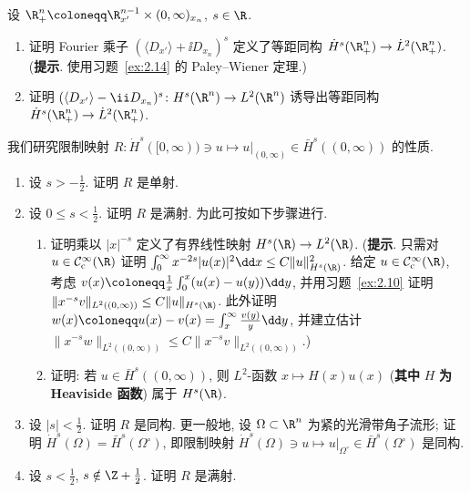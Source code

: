 \begin{exer}[移位算子]\label{ex:9.4}
设 $\R_+^n \defeq \R_{x'}^{n-1} \times (0, \infty)_{x_n}$, $s \in \R$.
\begin{enumerate}[label=(\arabic*)]
    \item 证明 Fourier 乘子 $(\langle D_{x'}\rangle + \ii D_{x_n})^s$ 定义了等距同构 $\dot{H}^s(\R_+^n) \to \dot{L}^2(\R_+^n)$. (\textbf{提示}. 使用习题~\ref{ex:2.14} 的 Paley--Wiener 定理.)
    \item 证明 $(\langle D_{x'}\rangle - \ii D_{x_n})^s \colon H^s(\R^n) \to L^2(\R^n)$ 诱导出等距同构 $\dot{H}^s(\R_+^n) \to \dot{L}^2(\R_+^n)$.
\end{enumerate}
\end{exer}

\begin{exer}[可延拓空间与具支空间的关系 I]\label{ex:9.5}
我们研究限制映射 $R \colon \dot{H}^s([0, \infty)) \ni u \mapsto u|_{(0, \infty)} \in \bar{H}^s((0, \infty))$ 的性质.
\begin{enumerate}[label=(\arabic*)]
    \item 设 $s > -\frac12$. 证明 $R$ 是单射.
    \item 设 $0 \le s < \frac12$. 证明 $R$ 是满射. 为此可按如下步骤进行.
    \begin{enumerate}[label=(\roman*)]
        \item 证明乘以 $|x|^{-s}$ 定义了有界线性映射 $H^s(\R) \to L^2(\R)$. (\textbf{提示}. 只需对 $u \in \SmoothComp(\R)$ 证明 $\int_0^\infty x^{-2s}|u(x)|^2 \dd x \le C\|u\|_{H^s(\R)}^2$. 给定 $u \in \SmoothComp(\R)$, 考虑 $v(x) \defeq \frac1x \int_0^x (u(x) - u(y)) \dd y$, 并用习题~\ref{ex:2.10} 证明 $\|x^{-s}v\|_{L^2((0,\infty))} \le C\|u\|_{H^s(\R)}$. 此外证明 $w(x) \defeq u(x) - v(x) = \int_x^\infty \frac{v(y)}{y} \dd y$, 并建立估计 $\|x^{-s}w\|_{L^2((0,\infty))} \le C\|x^{-s}v\|_{L^2((0,\infty))}$.)
        \item 证明: 若 $u \in \bar{H}^s((0, \infty))$, 则 $L^2$-函数 $x \mapsto H(x)u(x)$ (\textbf{其中} $H$ \textbf{为 Heaviside 函数}) 属于 $H^s(\R)$.
    \end{enumerate}
    \item 设 $|s| < \frac12$. 证明 $R$ 是同构. 更一般地, 设 $\Omega \subset \R^n$ 为紧的光滑带角子流形; 证明 $\dot{H}^s(\Omega) = \bar{H}^s(\Omega^\circ)$, 即限制映射 $\dot{H}^s(\Omega) \ni u \mapsto u|_{\Omega^\circ} \in \bar{H}^s(\Omega^\circ)$ 是同构.
    \item 设 $s < \frac12$, $s \notin \Z + \frac12$. 证明 $R$ 是满射.
\end{enumerate}
\end{exer}

